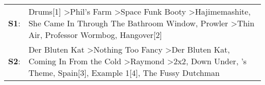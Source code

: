 \begin{supertabular}{p{0.03\textwidth}p{0.92\textwidth}}
 \textbf{S1}:  &                                                                  Drums[1]\textsuperscript{} \textgreater \enspace Phil's Farm\textsuperscript{} \textgreater \enspace Space Funk Booty\textsuperscript{} \textgreater \enspace Hajimemashite\textsuperscript{}, \enspace She Came In Through The Bathroom Window\textsuperscript{}, \enspace Prowler\textsuperscript{} \textgreater \enspace Thin Air\textsuperscript{}, \enspace Professor Wormbog\textsuperscript{}, \enspace Hangover[2]\textsuperscript{}  \enspace  \\
 \textbf{S2}:  &  Der Bluten Kat\textsuperscript{} \textgreater \enspace Nothing Too Fancy\textsuperscript{} \textgreater \enspace Der Bluten Kat\textsuperscript{}, \enspace Coming In From the Cold\textsuperscript{} \textgreater \enspace Raymond\textsuperscript{} \textgreater \enspace 2x2\textsuperscript{}, \enspace Down Under\textsuperscript{}, 's Theme\textsuperscript{}, \enspace Spain[3]\textsuperscript{}, \enspace Example 1[4]\textsuperscript{}, \enspace The Fussy Dutchman\textsuperscript{}  \enspace  \\
\end{supertabular}
